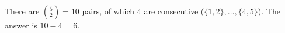 There are $\binom52=10$ pairs, of which $4$ are consecutive ($\{1,2\},\dots,\{4,5\}$). The answer is $10-4=\boxed{6}$.
